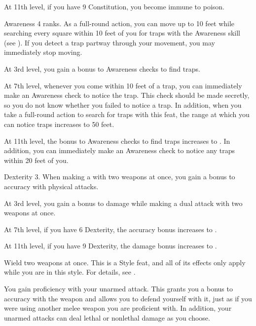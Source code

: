     At 11th level, if you have 9 Constitution, you become immune to poison.

    \featpre Awareness 4 ranks.
    \featben As a full-round action, you can move up to 10 feet while searching every square within 10 feet of you for traps with the Awareness skill (see ).
    If you detect a trap partway through your movement, you may immediately stop moving.

    At 3rd level, you gain a  bonus to Awareness checks to find traps.

    At 7th level, whenever you come within 10 feet of a trap, you can immediately make an Awareness check to notice the trap.
    This check should be made secretly, so you do not know whether you failed to notice a trap.
    In addition, when you take a full-round action to search for traps with this feat, the range at which you can notice traps increases to 50 feet.

    At 11th level, the bonus to Awareness checks to find traps increases to .
    In addition, you can immediately make an Awareness check to notice any traps within 20 feet of you.

    \featpre Dexterity 3.
    \featben When making a  with two weapons at once, you gain a  bonus to accuracy with physical attacks.

    At 3rd level, you gain a  bonus to damage while making a dual attack with two weapons at once.

    At 7th level, if you have 6 Dexterity, the accuracy bonus increases to .

    At 11th level, if you have 9 Dexterity, the damage bonus increases to .

    \stylereq Wield two weapons at once.
     This is a Style feat, and all of its effects only apply while you are in this style.
    For details, see .

    \featben You gain proficiency with your unarmed attack.
    This grants you a  bonus to accuracy with the weapon and allows you to defend yourself with it, just as if you were using another melee weapon you are proficient with.
    In addition, your unarmed attacks can deal lethal or nonlethal damage as you choose.

